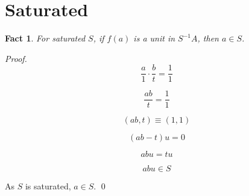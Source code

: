 \documentclass{article}
\newtheorem{theorem}{Fact}[section]
\begin{document}
\section{Saturated}

\begin{theorem}
For saturated $S$, if $f(a)$ is a unit in $S^{-1}A$, then $a \in S$.
\end{theorem}

\noindent
\textit{Proof.}
\[
  \frac{a}{1} \cdot \frac{b}{t} = \frac{1}{1} 
\]

\[
  \frac{ab}{t} = \frac{1}{1}
\]

\[
   (ab, t) \equiv (1, 1)
\]
 
\[
   (ab - t)u = 0
\]

\[
   abu = tu
\]

\[
   abu \in S
\]

As \( S \) is saturated, \( a \in S \).  \qed
\end{document}
